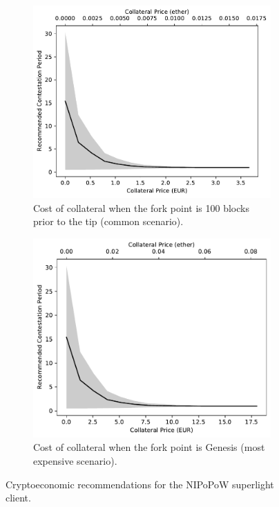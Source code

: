\begin{figure}[!h]
\begin{subfigure}{0.5\textwidth}
    \begin{center}
        \includegraphics[width=1\columnwidth]{figures/cryptoeconomics-collateral-100.pdf}
    \end{center}
    \caption{Cost of collateral when the fork point is 100 blocks prior to the
    tip (common scenario).}
    \label{fig:cryptoeconomics-collateral-100}
\end{subfigure}
\hspace{0.5cm}
\begin{subfigure}{0.5\textwidth}
    \begin{center}
        \includegraphics[width=1\columnwidth]{figures/cryptoeconomics-collateral-genesis.pdf}
    \end{center}
    \caption{Cost of collateral when the fork point is Genesis (most expensive scenario).}
    \label{fig:cryptoeconomics-collateral-genesis}
\end{subfigure}
\caption{Cryptoeconomic recommendations for the NIPoPoW superlight client.}
\label{fig:cryptoeconomics-collateral}
\end{figure}

